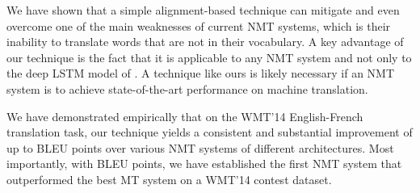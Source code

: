 
We have shown that a simple alignment-based technique can mitigate and even
overcome one of the main weaknesses of current NMT systems, which is
their inability to translate words that are not in their vocabulary.  
A key advantage of our technique is the fact that it is applicable to any NMT system and not
only to the deep LSTM model of .  A technique
like ours is likely necessary if an NMT system is to achieve state-of-the-art performance
on machine translation.

We have demonstrated empirically that on the WMT'14 English-French translation task, our technique yields a 
consistent and substantial improvement of up to \bestunkimp{} BLEU points over various NMT systems of different architectures. 
Most importantly, with \bestbleuunk{} BLEU points, we have established the first NMT system that outperformed 
the best MT system on a WMT'14 contest dataset.


